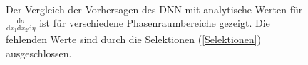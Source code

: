 \begin{figure}[tbp]
	 \\
	\caption{Der Vergleich der Vorhersagen des DNN mit analytische Werten für $\frac{\text{d} \sigma}{\text{d}x_1\text{d}x_2\text{d}\eta}$ ist für verschiedene Phasenraumbereiche gezeigt. Die fehlenden Werte sind durch die Selektionen (\textsf{\autoref{Selektionen}}) ausgeschlossen.}
	\label{Schnitte Hadron}
\end{figure}

